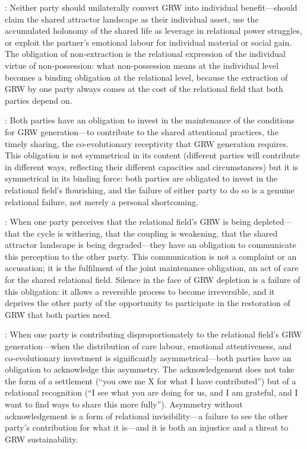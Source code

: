 : Neither party should unilaterally convert GRW into individual benefit---should claim the shared attractor landscape as their individual asset, use the accumulated holonomy of the shared life as leverage in relational power struggles, or exploit the partner's emotional labour for individual material or social gain. The obligation of non-extraction is the relational expression of the individual virtue of non-possession: what non-possession means at the individual level becomes a binding obligation at the relational level, because the extraction of GRW by one party always comes at the cost of the relational field that both parties depend on.

: Both parties have an obligation to invest in the maintenance of the conditions for GRW generation---to contribute to the shared attentional practices, the timely sharing, the co-evolutionary receptivity that GRW generation requires. This obligation is not symmetrical in its content (different parties will contribute in different ways, reflecting their different capacities and circumstances) but it is symmetrical in its binding force: both parties are obligated to invest in the relational field's flourishing, and the failure of either party to do so is a genuine relational failure, not merely a personal shortcoming.

: When one party perceives that the relational field's GRW is being depleted---that the cycle is withering, that the coupling is weakening, that the shared attractor landscape is being degraded---they have an obligation to communicate this perception to the other party. This communication is not a complaint or an accusation; it is the fulfilment of the joint maintenance obligation, an act of care for the shared relational field. Silence in the face of GRW depletion is a failure of this obligation: it allows a reversible process to become irreversible, and it deprives the other party of the opportunity to participate in the restoration of GRW that both parties need.

: When one party is contributing disproportionately to the relational field's GRW generation---when the distribution of care labour, emotional attentiveness, and co-evolutionary investment is significantly asymmetrical---both parties have an obligation to acknowledge this asymmetry. The acknowledgement does not take the form of a settlement (``you owe me X for what I have contributed'') but of a relational recognition (``I see what you are doing for us, and I am grateful, and I want to find ways to share this more fully''). Asymmetry without acknowledgement is a form of relational invisibility---a failure to see the other party's contribution for what it is---and it is both an injustice and a threat to GRW sustainability.


